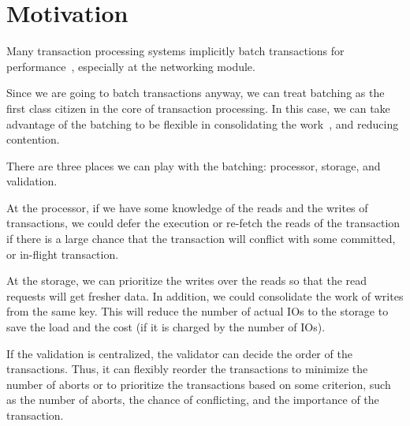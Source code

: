 \section{Motivation}
 
Many transaction processing systems implicitly batch transactions for performance~\cite{tu2013speedy, thomson2012calvin, ding2015centiman}, especially at the networking module.

Since we are going to batch transactions anyway, we can treat batching as the first class citizen in the core of transaction processing. 
In this case, we can take advantage of the batching to be flexible in consolidating the work~\cite{faleiro2014lazy}, and reducing contention. 

There are three places we can play with the batching: processor, storage, and validation.

At the processor, if we have some knowledge of the reads and the writes of transactions, we could defer the execution or re-fetch the reads of the transaction if there is a large chance that the transaction will conflict with some committed, or in-flight transaction.

At the storage, we can prioritize the writes over the reads so that the read requests will get fresher data. 
In addition, we could consolidate the work of writes from the same key. 
This will reduce the number of actual IOs to the storage to save the load and the cost (if it is charged by the number of IOs).

If the validation is centralized, the validator can decide the order of the transactions.
Thus, it can flexibly reorder the transactions to minimize the number of aborts or to prioritize the transactions based on some criterion, such as the number of aborts, the chance of conflicting, and the importance of the transaction.


